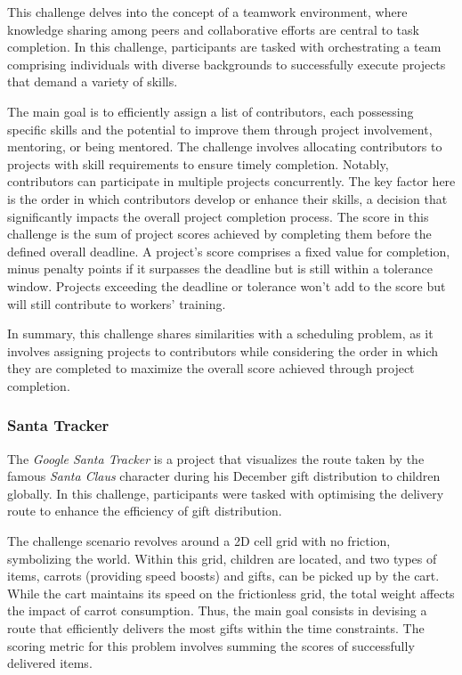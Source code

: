 This challenge delves into the concept of a teamwork environment, where
knowledge sharing among peers and collaborative efforts are central to task
completion. In this challenge, participants are tasked with orchestrating a team
comprising individuals with diverse backgrounds to successfully execute projects
that demand a variety of skills.

The main goal is to efficiently assign a list of contributors, each possessing
specific skills and the potential to improve them through project involvement,
mentoring, or being mentored. The challenge involves allocating contributors to
projects with skill requirements to ensure timely completion. Notably,
contributors can participate in multiple projects concurrently. The key factor
here is the order in which contributors develop or enhance their skills, a
decision that significantly impacts the overall project completion process.
The score in this challenge is the sum of project scores achieved by completing
them before the defined overall deadline. A project's score comprises a fixed
value for completion, minus penalty points if it surpasses the deadline but is
still within a tolerance window. Projects exceeding the deadline or tolerance won't
add to the score but will still contribute to workers' training.

In summary, this challenge shares similarities with a scheduling problem, as it
involves assigning projects to contributors while considering the order in which
they are completed to maximize the overall score achieved through project
completion.

\subsubsection*{Santa Tracker}
\label{subsubsec:hashcode-2022-final}

The \textit{Google Santa Tracker} is a project that visualizes the route taken
by the famous \textit{Santa Claus} character during his December gift
distribution to children globally. In this challenge, participants were tasked
with optimising the delivery route to enhance the efficiency of gift
distribution.

The challenge scenario revolves around a 2D cell grid with no friction,
symbolizing the world. Within this grid, children are located, and two types of
items, carrots (providing speed boosts) and gifts, can be picked up by the cart.
While the cart maintains its speed on the frictionless grid, the total weight
affects the impact of carrot consumption. Thus, the main goal consists in
devising a route that efficiently delivers the most gifts within the time
constraints. The scoring metric for this problem involves summing the scores of
successfully delivered items.

